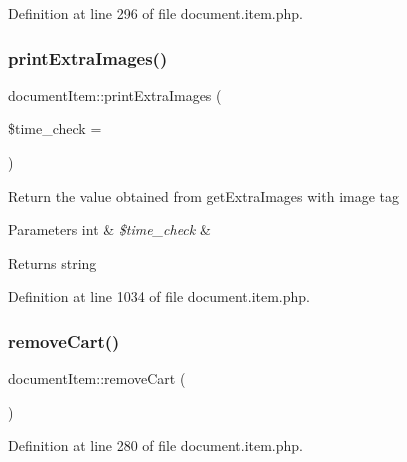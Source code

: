 Definition at line 296 of file document.\+item.\+php.

\hypertarget{classdocumentItem_a9d185a16e4439823e7e4871c2fb0659a}{}\label{classdocumentItem_a9d185a16e4439823e7e4871c2fb0659a} 
\subsubsection{\texorpdfstring{print\+Extra\+Images()}{printExtraImages()}}
{\footnotesize\ttfamily document\+Item\+::print\+Extra\+Images (\begin{DoxyParamCaption}\item[{}]{\$time\+\_\+check = {} }\end{DoxyParamCaption})}

Return the value obtained from get\+Extra\+Images with image tag 
\begin{DoxyParams}[1]{Parameters}
int & {\em \$time\+\_\+check} & \\
\hline
\end{DoxyParams}
\begin{DoxyReturn}{Returns}
string 
\end{DoxyReturn}


Definition at line 1034 of file document.\+item.\+php.

\hypertarget{classdocumentItem_aa66932772c39aeff91238badd8246969}{}\label{classdocumentItem_aa66932772c39aeff91238badd8246969} 
\subsubsection{\texorpdfstring{remove\+Cart()}{removeCart()}}
{\footnotesize\ttfamily document\+Item\+::remove\+Cart (\begin{DoxyParamCaption}{ }\end{DoxyParamCaption})}



Definition at line 280 of file document.\+item.\+php.

\hypertarget{classdocumentItem_a47d377b1f8ae94615b363f4f00bc94fc}{}\label{classdocumentItem_a47d377b1f8ae94615b363f4f00bc94fc} 
